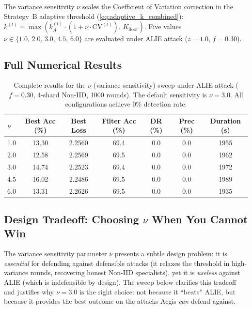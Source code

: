\documentclass[../main]{subfiles}
\begin{document}
The variance sensitivity $\nu$ scales the Coefficient of Variation correction
in the Strategy~B adaptive threshold (\cref{eq:adaptive_k_combined}):
$k^{(t)} = \max(k_A^{(t)} \cdot (1 + \nu \cdot \mathrm{CV}^{(t)}),\, K_{\text{floor}})$.
Five values $\nu \in \{1.0,\, 2.0,\, 3.0,\, 4.5,\, 6.0\}$ are evaluated under
ALIE attack ($z=1.0$, $f=0.30$).

\subsection{Full Numerical Results}
\label{app:nu_sweep_results}

\begin{table}[htbp]
\centering
\caption{Complete results for the $\nu$ (variance sensitivity) sweep under ALIE attack
($f=0.30$, 4-shard Non-IID, 1000 rounds).
The default sensitivity is $\nu = 3.0$. All configurations achieve $0\%$ detection rate.}
\label{tab:app_nu_full}
\small
\setlength{\tabcolsep}{4pt}
\begin{tabular}{lcccccc}
\toprule
$\nu$ & \textbf{Best Acc (\%)} & \textbf{Best Loss}
      & \textbf{Filter Acc (\%)} & \textbf{DR (\%)} & \textbf{Prec (\%)}
      & \textbf{Duration (s)} \\
\midrule
1.0           & 13.30 & 2.2560 & 69.4 & 0.0 & 0.0 & 1955 \\
2.0           & 12.58 & 2.2569 & 69.5 & 0.0 & 0.0 & 1962 \\
3.0           & 14.74 & 2.2523 & 69.4 & 0.0 & 0.0 & 1972 \\
4.5           & 16.02 & 2.2486 & 69.5 & 0.0 & 0.0 & 1989 \\
6.0           & 13.31 & 2.2626 & 69.5 & 0.0 & 0.0 & 1935 \\
\bottomrule
\end{tabular}
\end{table}

\subsection{Design Tradeoff: Choosing \texorpdfstring{$\nu$}{nu} When You Cannot Win}
\label{app:nu_sweep_obs}

The variance sensitivity parameter $\nu$ presents a subtle design problem: it is \emph{essential} for defending against
defensible attacks (it relaxes the threshold in high-variance rounds, recovering honest Non-IID specialists), yet
it is \emph{useless} against ALIE (which is indefensible by design).
The sweep below clarifies this tradeoff and justifies why $\nu = 3.0$ is the right choice: not because it ``beats'' ALIE,
but because it provides the best outcome on the attacks Aegis \emph{can} defend against.
\end{document}
